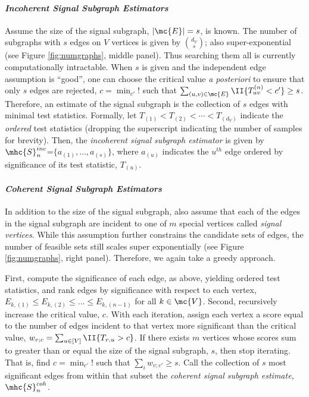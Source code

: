 \documentclass[10pt,journal,cspaper,compsoc]{IEEEtran}
\begin{document}
\paragraph{\emph{Incoherent Signal Subgraph Estimators}} %
\label{par:paragraph_name}


Assume the size of the signal subgraph, $|\mc{E}|=s$, is known.  The number of subgraphs with $s$ edges on $V$ vertices is given by $\binom{d_V}{s}$; also super-exponential (see Figure \ref{fig:numgraphs}, middle panel). Thus searching them all is currently computationally intractable.  When $s$ is given and the independent edge assumption is ``good'', one can choose the critical value \emph{a posteriori} to ensure that only $s$ edges are rejected, $c = \min_{c'}!$ such that $\sum_{(u,v) \in \mc{E}} \II \{T_{uv}^{(n)} < c'\} \geq s$.  Therefore, an estimate of the signal subgraph is the collection of $s$ edges with minimal test statistics.  Formally, let $T_{(1)} < T_{(2)} < \cdots < T_{(d_V)}$ indicate the \emph{ordered} test statistics (dropping the superscript indicating the number of samples for brevity).  Then, the \emph{incoherent signal subgraph estimator} is given by $\mhc{S}^{inc}_n$=$\{a_{(1)}, \ldots, a_{(s)}\}$, where $a_{(u)}$ indicates the $u^{th}$ edge ordered by significance of its test statistic, $T_{(u)}$.  %

\paragraph{\emph{Coherent Signal Subgraph Estimators}}

In addition to the size of the signal subgraph, also assume that each of the edges in the signal subgraph are incident to one of $m$ special vertices called \emph{signal vertices}. While this assumption further constrains the candidate sets of edges, the number of feasible sets still scales super exponentially (see Figure \ref{fig:numgraphs}, right panel).  Therefore, we again take a greedy approach.  

First, compute the significance of each edge, as above, yielding ordered test statistics, and rank edges by significance with respect to each vertex,  $E_{k,(1)} \leq E_{k,(2)} \leq \ldots \leq E_{k,(n-1)}$ for all $k \in \mc{V}$.  Second, recursively increase the critical value, $c$. With each iteration, assign each vertex a score equal to the number of edges incident to that vertex more significant than the critical value, $w_{v;c}=\sum_{u \in [V]} \II\{T_{v,u} > c\}$.  If there exists $m$ vertices whose scores sum to greater than or equal the size of the signal subgraph, $s$, then stop iterating.  That is, find $c=\min_{c'} !$ such that $\sum_{i} w_{v;c'}\geq s$.  Call the collection of $s$ most significant edges from within that subset the \emph{coherent signal subgraph estimate}, $\mhc{S}^{coh}_n$. %
\end{document}
